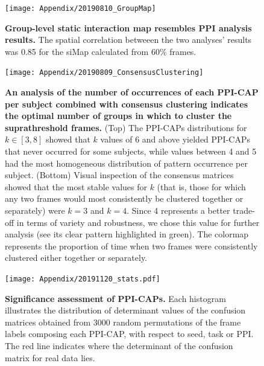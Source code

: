 \begin{figure}[h]
\centering
\texttt{[image: Appendix/20190810\_GroupMap]}
\caption{\textbf{Group-level static interaction map resembles PPI analysis results.} The spatial correlation betweeen the two analyses' results was 0.85 for the siMap calculated from 60\% frames. }
\label{fig:groupSimap}
\end{figure}


\begin{figure}[h]
\centering
\texttt{[image: Appendix/20190809\_ConsensusClustering]}
\caption{\textbf{An analysis of the number of occurrences of each PPI-CAP per subject combined with consensus clustering indicates the optimal number of groups in which to cluster the suprathreshold frames.} (Top) The PPI-CAPs distributions for  $k\in[3, 8]$ showed that $k$ values of 6 and above yielded PPI-CAPs that never occurred for some subjects, while values between 4 and 5 had the most homogeneous distribution of pattern occurrence per subject. (Bottom) Visual inspection of the consensus matrices showed that the most stable values for $k$ (that is, those for which any two frames would most consistently be clustered together or separately) were $k=3$ and $k=4$. Since 4 represents a better trade-off in terms of variety and robustness, we chose this value for further analysis (see its clear pattern highlighted in green). The colormap represents the proportion of time when two frames were consistently clustered either together or separately.}
\label{fig:consensus}
\end{figure}

\begin{figure}[h]
\centering
\texttt{[image: Appendix/20191120\_stats.pdf]}
\caption{\textbf{Significance assessment of PPI-CAPs.} Each histogram illustrates the distribution of determinant values of the confusion matrices obtained from 3000 random permutations of the frame labels composing each PPI-CAP, with respect to seed, task or PPI. The red line indicates where the determinant of the confusion matrix for real data lies.  }
\label{fig:permanova}
\end{figure}



